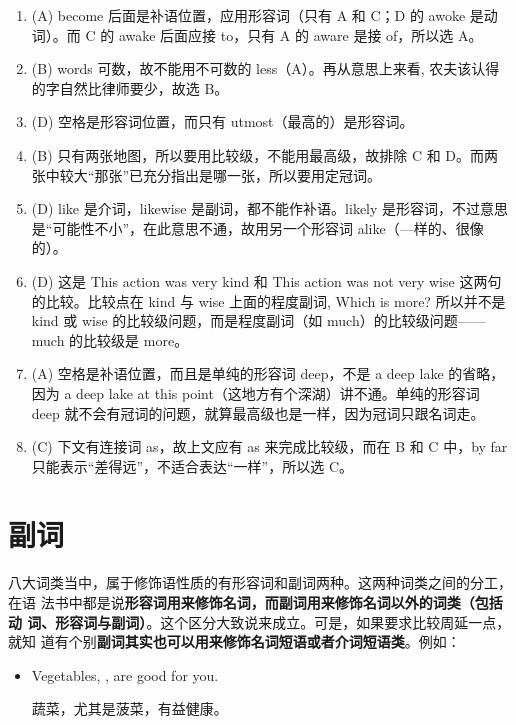 \begin{enumerate}
\item (A) become 后面是补语位置，应用形容词（只有 A 和 C；D 的 awoke 是动词）。而 C 的 awake 后面应接 to，只有 A 的 aware 是接 of，所以选 A。
\item (B) words 可数，故不能用不可数的 less（A）。再从意思上来看, 农夫该认得的字自然比律师要少，故选 B。

\item  (D) 空格是形容词位置，而只有 utmost（最高的）是形容词。

\item  (B) 只有两张地图，所以要用比较级，不能用最高级，故排除 C 和 D。而两张中较大“那张”已充分指出是哪一张，所以要用定冠词。

\item  (D) like 是介词，likewise 是副词，都不能作补语。likely 是形容词，不过意思是“可能性不小”，在此意思不通，故用另一个形容词 alike（—样的、很像的）。

\item (D) 这是 This action was very kind 和 This action was not very wise 这两句的比较。比较点在 kind 与 wise 上面的程度副词, Which is more? 所以并不是 kind 或 wise 的比较级问题，而是程度副词（如 much）的比较级问题——much 的比较级是 more。

\item (A) 空格是补语位置，而且是单纯的形容词 deep，不是 a deep lake 的省略，因为 a deep lake at this point（这地方有个深湖）讲不通。单纯的形容词 deep 就不会有冠词的问题，就算最高级也是一样，因为冠词只跟名词走。

\item (C) 下文有连接词 as，故上文应有 as 来完成比较级，而在 B 和 C 中，by far 只能表示“差得远”，不适合表达“一样”，所以选 C。
\end{enumerate}

\chapter{副词}

八大词类当中，属于修饰语性质的有形容词和副词两种。这两种词类之间的分工，在语
法书中都是说\textbf{形容词用来修饰名词，而副词用来修饰名词以外的词类（包括动
  词、形容词与副词）}。这个区分大致说来成立。可是，如果要求比较周延一点，就知
道有个别\textbf{副词其实也可以用来修饰名词短语或者介词短语类}。例如：

\begin{itemize}
\item  Vegetables, , are good for you.

  蔬菜，尤其是菠菜，有益健康。
\end{itemize}

